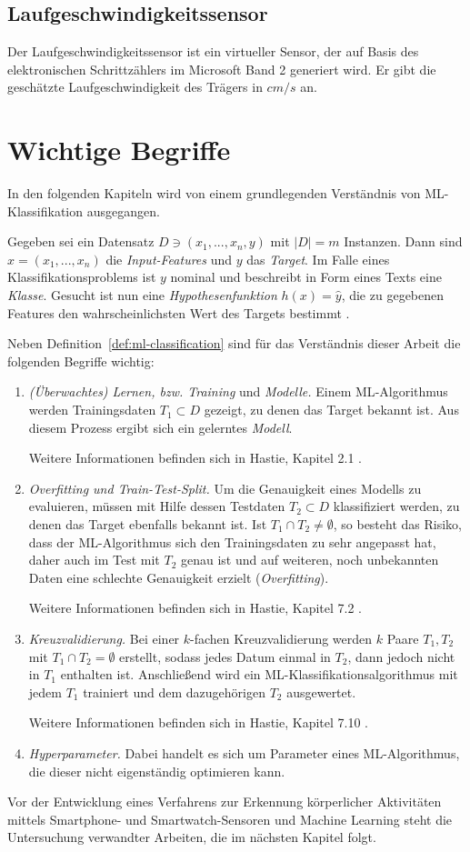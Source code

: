 \subsection{Laufgeschwindigkeitssensor}
Der Laufgeschwindigkeitssensor ist ein virtueller Sensor, der auf Basis des elektronischen Schrittzählers im Microsoft Band 2 generiert wird. Er gibt die geschätzte Laufgeschwindigkeit des Trägers in $cm/s$ an.

\section{Wichtige Begriffe}
In den folgenden Kapiteln wird von einem grundlegenden Verständnis von \ac{ML}-Klassifikation ausgegangen.

\begin{definition}[\ac{ML}-Klassifikation]
\label{def:ml-classification}
Gegeben sei ein Datensatz $D \ni (x_1, ..., x_n, y)$ mit $|D| = m$ Instanzen. Dann sind $x = (x_1, ..., x_n)$ die \textit{Input-Features} und $y$ das \textit{Target}. Im Falle eines Klassifikationsproblems ist $y$ nominal und beschreibt in Form eines Texts eine \textit{Klasse}. Gesucht ist nun eine \textit{Hypothesenfunktion} $h(x) = \hat{y}$, die zu gegebenen Features den wahrscheinlichsten Wert des Targets bestimmt \cite{Ng2011a}.
\end{definition}
Neben Definition~\ref{def:ml-classification} sind für das Verständnis dieser Arbeit die folgenden Begriffe wichtig:
\begin{enumerate}
\item \textit{(Überwachtes) Lernen, bzw. Training} und \textit{Modelle.} Einem \ac{ML}-Algorithmus werden Trainingsdaten $T_1 \subset D$ gezeigt, zu denen das Target bekannt ist. Aus diesem Prozess ergibt sich ein gelerntes \textit{Modell}. 

Weitere Informationen befinden sich in Hastie, Kapitel 2.1 \cite{Hastie2009}.
\item \textit{Overfitting und Train-Test-Split.} Um die Genauigkeit eines Modells zu evaluieren, müssen mit Hilfe dessen Testdaten $T_2 \subset D$ klassifiziert werden, zu denen das Target ebenfalls bekannt ist. Ist $T_1 \cap T_2 \neq \emptyset$, so besteht das Risiko, dass der \ac{ML}-Algorithmus sich den Trainingsdaten zu sehr angepasst hat, daher auch im Test mit $T_2$ genau ist und auf weiteren, noch unbekannten Daten eine schlechte Genauigkeit erzielt (\textit{Overfitting}). 

Weitere Informationen befinden sich in Hastie, Kapitel 7.2 \cite{Hastie2009}.
\item \textit{Kreuzvalidierung.} Bei einer $k$-fachen Kreuzvalidierung werden $k$ Paare $T_1, T_2$ mit $T_1 \cap T_2 = \emptyset$ erstellt, sodass jedes Datum einmal in $T_2$, dann jedoch nicht in $T_1$ enthalten ist. Anschließend wird ein \ac{ML}-Klassifikationsalgorithmus mit jedem $T_1$ trainiert und dem dazugehörigen $T_2$ ausgewertet. 

Weitere Informationen befinden sich in Hastie, Kapitel 7.10 \cite{Hastie2009}.
\item \textit{Hyperparameter.}  Dabei handelt es sich um Parameter eines \ac{ML}-Algorithmus, die dieser nicht eigenständig optimieren kann.
\end{enumerate}

Vor der Entwicklung eines Verfahrens zur Erkennung körperlicher Aktivitäten mittels Smartphone- und Smartwatch-Sensoren und Machine Learning steht die Untersuchung verwandter Arbeiten, die im nächsten Kapitel folgt.


